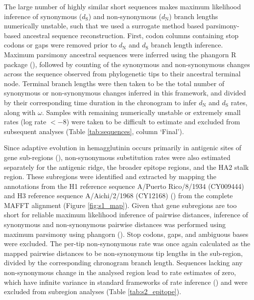 \documentclass[11pt, a4paper]{article}
\begin{document}
The large number of highly similar short sequences makes maximum likelihood inference of synonymous ($d_\text{S}$) and non-synonymous ($d_\text{N}$) branch lengths numerically unstable, such that we used a surrogate method based parsimony-based ancestral sequence reconstruction. First, codon columns containing stop codons or gaps were removed prior to $d_\text{N}$ and $d_\text{S}$ branch length inference. Maximum parsimony ancestral sequences were inferred using the phangorn R package (\cite{schliep_phangorn_2011}), followed by counting of the synonymous and non-synonymous changes across the sequence observed from phylogenetic tips to their ancestral terminal node. Terminal branch lengths were then taken to be the total number of synonymous or non-synonymous changes inferred in this framework, and divided by their corresponding time duration in the chronogram to infer $d_\text{N}$ and $d_\text{S}$ rates, along with $\omega$. Samples with remaining numerically unstable or extremely small rates (log rate $< -$8) were taken to be difficult to estimate and excluded from subsequent analyses (Table \ref{tab:sequences}, column `Final').

Since adaptive evolution in hemagglutinin  occurs primarily in antigenic sites of gene sub-regions (\cite{bush_positive_1999}), non-synonymous substitution rates were also estimated separately for the antigenic ridge, the broader epitope regions, and the HA2 stalk region. These subregions were identified and extracted by mapping the annotations from the H1 reference sequence A/Puerto Rico/8/1934 (CY009444) and H3 reference sequence A/Aichi/2/1968 (CY12168) (\cite{bao_influenza_2008}) from the complete MAFFT alignment (Figure \ref{fig:s1_map}). Given that gene subregions are too short for reliable maximum likelihood inference of pairwise distances, inference of synonymous and non-synonymous pairwise distances was performed using maximum parsimony using phangorn (\cite{schliep_phangorn_2011}). Stop codons, gaps, and ambiguous bases were excluded. The per-tip non-synonymous rate was once again calculated as the mapped pairwise distances to be non-synonymous tip lengths in the sub-region, divided by the corresponding chronogram branch length. Sequences lacking any non-synonymous change in the analysed region lead to rate estimates of zero, which have infinite variance in standard frameworks of rate inference (\cite{sanderson_estimating_2002, angelis_bayesian_2014}) and were excluded from subregion analyses (Table \ref{tab:s2_epitope}).
\end{document}
